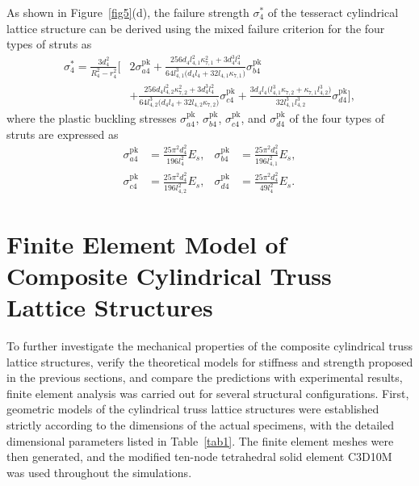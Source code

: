 \documentclass[12pt,a4paper]{article}
\begin{document}
As shown in Figure~\ref{fig5}(d), the failure strength $\sigma_4^*$ of the tesseract cylindrical lattice structure can be derived using the mixed failure criterion for the four types of struts as
%
\begin{equation}
	\begin{aligned}
		\sigma_4^*
		=
		\frac{3d_4^2}{R_4^2-r_4^2}
		\Bigg[
		&2\sigma_{a4}^{\mathrm{pk}}
		+
		\frac{
			256d_4l_{4,1}^2\kappa_{7,1}^2
			+3d_4^3l_4^2
		}{
			64l_{4,1}^3
			\bigl(
			d_4l_4+32l_{4,1}\kappa_{7,1}
			\bigr)
		}
		\sigma_{b4}^{\mathrm{pk}}
		\\
		&+
		\frac{
			256d_4l_{4,2}^2\kappa_{7,2}^2
			+3d_4^3l_4^2
		}{
			64l_{4,2}^3
			\bigl(
			d_4l_4+32l_{4,2}\kappa_{7,2}
			\bigr)
		}
		\sigma_{c4}^{\mathrm{pk}}
		+
		\frac{
			3d_4l_4
			\bigl(
			l_{4,1}^3\kappa_{7,2}
			+\kappa_{7,1}l_{4,2}^3
			\bigr)
		}{
			32l_{4,1}^3l_{4,2}^3
		}
		\sigma_{d4}^{\mathrm{pk}}
		\Bigg],
	\end{aligned}
	\label{Eq29}
\end{equation}
%
where the plastic buckling stresses $\sigma_{a4}^{\mathrm{pk}}$, $\sigma_{b4}^{\mathrm{pk}}$, $\sigma_{c4}^{\mathrm{pk}}$, and $\sigma_{d4}^{\mathrm{pk}}$ of the four types of struts are expressed as
%
\[
\begin{aligned}
	\sigma_{a4}^{\mathrm{pk}}
	&=
	\frac{25\pi^2d_4^2}{196l_4^2}E_s, &
	\sigma_{b4}^{\mathrm{pk}}
	&=
	\frac{25\pi^2d_4^2}{196l_{4,1}^2}E_s, \\
	\sigma_{c4}^{\mathrm{pk}}
	&=
	\frac{25\pi^2d_4^2}{196l_{4,2}^2}E_s, &
	\sigma_{d4}^{\mathrm{pk}}
	&=
	\frac{25\pi^2d_4^2}{49l_4^2}E_s .
\end{aligned}
\]

	
\section{Finite Element Model of Composite Cylindrical Truss Lattice Structures}

To further investigate the mechanical properties of the composite cylindrical truss lattice structures, verify the theoretical models for stiffness and strength proposed in the previous sections, and compare the predictions with experimental results, finite element analysis was carried out for several structural configurations. First, geometric models of the cylindrical truss lattice structures were established strictly according to the dimensions of the actual specimens, with the detailed dimensional parameters listed in Table~\ref{tab1}. The finite element meshes were then generated, and the modified ten-node tetrahedral solid element C3D10M was used throughout the simulations.
\end{document}
